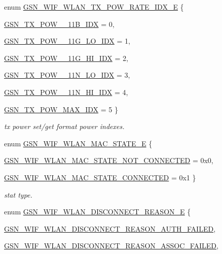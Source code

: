 \begin{DoxyCompactItemize}
enum \hyperlink{a00677_ga75fc31972dc5127c4ee4b3e585ab0206}{GSN\_\-WIF\_\-WLAN\_\-TX\_\-POW\_\-RATE\_\-IDX\_\-E} \{ \par
\hyperlink{a00640_gga75fc31972dc5127c4ee4b3e585ab0206aa8ef942d0ca232cab8243a718383af18}{GSN\_\-TX\_\-POW\_\_\-11B\_\-IDX} =  0, 
\par
\hyperlink{a00640_gga75fc31972dc5127c4ee4b3e585ab0206ae3826b232cc1ee4a30d46890b0718bb0}{GSN\_\-TX\_\-POW\_\_\-11G\_\-LO\_\-IDX} =  1, 
\par
\hyperlink{a00640_gga75fc31972dc5127c4ee4b3e585ab0206aa05a5fdd8b3cbb522655e6c2e400bd23}{GSN\_\-TX\_\-POW\_\_\-11G\_\-HI\_\-IDX} =  2, 
\par
\hyperlink{a00640_gga75fc31972dc5127c4ee4b3e585ab0206a2b481aadf4f8c66408beb3dfa4d84fc7}{GSN\_\-TX\_\-POW\_\_\-11N\_\-LO\_\-IDX} =  3, 
\par
\hyperlink{a00640_gga75fc31972dc5127c4ee4b3e585ab0206a0d66ebcda580eb26e8347354d3087d70}{GSN\_\-TX\_\-POW\_\_\-11N\_\-HI\_\-IDX} =  4, 
\par
\hyperlink{a00640_gga75fc31972dc5127c4ee4b3e585ab0206a647770c3d643ef01c522760760b94172}{GSN\_\-TX\_\-POW\_\-MAX\_\-IDX} =  5
 \}
\begin{DoxyCompactList}\small\item\em tx power set/get format power indexes. \end{DoxyCompactList}\item 
enum \hyperlink{a00677_gaf26e714e09b57b3b2a5f21341613761d}{GSN\_\-WIF\_\-WLAN\_\-MAC\_\-STATE\_\-E} \{ \par
\hyperlink{a00640_ggaf26e714e09b57b3b2a5f21341613761da29bec55c1820017c55b7eebc1cbb2698}{GSN\_\-WIF\_\-WLAN\_\-MAC\_\-STATE\_\-NOT\_\-CONNECTED} =  0x0, 
\par
\hyperlink{a00640_ggaf26e714e09b57b3b2a5f21341613761daf9bfe447cd6ae519e8f1f06ce72a39a9}{GSN\_\-WIF\_\-WLAN\_\-MAC\_\-STATE\_\-CONNECTED} =  0x1
 \}
\begin{DoxyCompactList}\small\item\em stat type. \end{DoxyCompactList}\item 
enum \hyperlink{a00677_ga9dd854d0108dc49ff077a04e897e3518}{GSN\_\-WIF\_\-WLAN\_\-DISCONNECT\_\-REASON\_\-E} \{ \par
\hyperlink{a00640_gga9dd854d0108dc49ff077a04e897e3518af4c7545e3a50f0a4b80e819642f6fa11}{GSN\_\-WIF\_\-WLAN\_\-DISCONNECT\_\-REASON\_\-AUTH\_\-FAILED}, 
\par
\hyperlink{a00640_gga9dd854d0108dc49ff077a04e897e3518ab326383254792bc87a5b3dd116a846fa}{GSN\_\-WIF\_\-WLAN\_\-DISCONNECT\_\-REASON\_\-ASSOC\_\-FAILED}, 

\end{DoxyCompactItemize}
